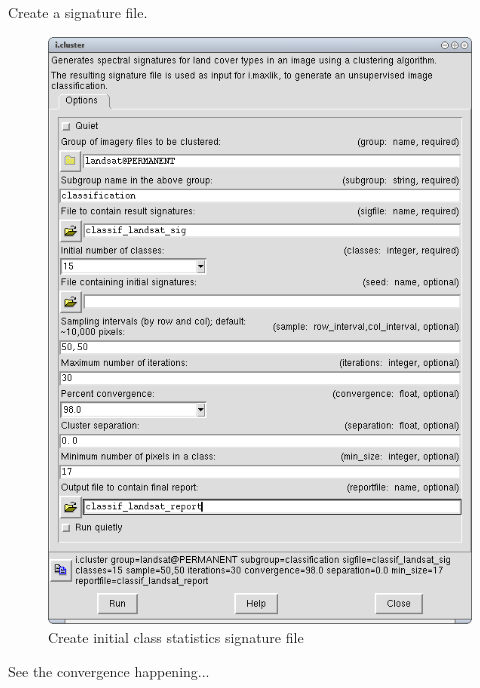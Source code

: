 Create a signature file.

\begin{figure}[htbp]
   \centering
   \includegraphics[scale=0.35]{grass_rs009.png}
   \caption{Create initial class statistics signature file}
   \label{fig:grass_rs009}
\end{figure}

See the convergence happening...

